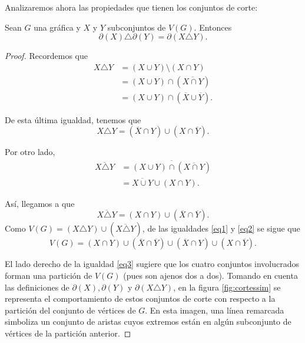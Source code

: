 Analizaremos ahora las propiedades que tienen los conjuntos de corte:
\begin{teo}\label{teo:diferenciasimetricacortes}
Sean $G$ una gráfica y  $X$ y $Y$ subconjuntos de $V(G)$. Entonces $$\partial(X) \triangle \partial(Y) = \partial(X \triangle Y).$$
\end{teo}

\begin{proof}
Recordemos que  
\begin{align*}
    X \triangle Y &= (X \cup Y)\setminus(X \cap Y) \\
                  &= (X \cup Y) \cap (\overline{X \cap Y})\\ 
                  &= (X \cup Y) \cap (\overline{X} \cup \overline{Y}).
\end{align*}

De esta última igualdad, tenemos que 
\begin{equation} \label{eq1}
    X \triangle Y = (\overline{X}\cap Y) \cup (X \cap \overline{Y}).
\end{equation}

Por otro lado,
\begin{align*}
    \overline{X \triangle Y} &= \overline{(X \cup Y) \cap (\overline{X \cap Y})} \\
                  &= \overline{X \cup Y} \cup (X \cap Y).
\end{align*}

 Así, llegamos a que
\begin{equation} \label{eq2}
   \overline{X \triangle Y} = (X \cap Y) \cup (\overline{X} \cap \overline{Y}).
\end{equation}
Como $V(G)=(X \triangle Y) \cup (\overline{X \triangle Y})$, de las igualdades \ref{eq1} y \ref{eq2} se sigue que 
\begin{equation} \label{eq3}
    V(G) = (X \cap Y) \cup (\overline{X} \cap \overline{Y}) \cup (\overline{X} \cap Y) \cup (X \cap \overline{Y}).
\end{equation}

El lado derecho de la igualdad \ref{eq3} sugiere que los cuatro conjuntos involucrados forman una partición de $V(G)$ (pues son ajenos dos a dos). Tomando en cuenta las definiciones de $\partial(X), \partial(Y)$ y  $\partial(X \triangle Y)$, en la figura \ref{fig:cortessim} se representa el comportamiento de estos conjuntos de corte con respecto a la partición del conjunto de vértices de $G$. En esta imagen, una línea remarcada simboliza un conjunto de aristas cuyos extremos están en algún subconjunto de vértices de la partición anterior.


\end{proof}
